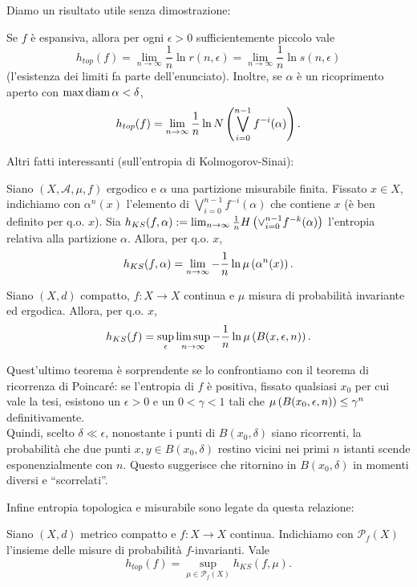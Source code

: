Diamo un risultato utile senza dimostrazione:

\begin{teo}Se $f$ è espansiva, allora per ogni $\epsilon>0$ sufficientemente piccolo vale
\[ h_{top}(f)=\lim_{n\to\infty}\frac{1}{n}\ln r(n,\epsilon)=\lim_{n\to\infty}\frac{1}{n}\ln s(n,\epsilon) \]
(l'esistenza dei limiti fa parte dell'enunciato). Inoltre, se $\alpha$ è un ricoprimento aperto con $\max\operatorname{diam} \alpha<\delta$,
\[ h_{top}(f)=\lim_{n\to\infty}\frac{1}{n}\ln N\left(\bigvee_{i=0}^{n-1}f^{-i}(\alpha)\right). \]
\end{teo}

Altri fatti interessanti (sull'entropia di Kolmogorov-Sinai):

\begin{teo}Siano $(X,\mathcal{A},\mu,f)$ ergodico e $\alpha$ una partizione misurabile finita.
Fissato $x\in X$, indichiamo con $\alpha^n(x)$ l'elemento di $\bigvee_{i=0}^{n-1}f^{-i}(\alpha)$ che contiene $x$
(è ben definito per q.o. $x$). Sia $h_{KS}(f,\alpha):=\lim_{n\to\infty}\frac{1}{n}H\left(\vee_{i=0}^{n-1}f^{-k}(\alpha)\right)$
l'entropia relativa alla partizione $\alpha$. Allora, per q.o. $x$,
\[ h_{KS}(f,\alpha)=\lim_{n\to\infty}-\frac{1}{n}\ln \mu\left(\alpha^n(x)\right). \]
\end{teo}

\begin{teo}Siano $(X,d)$ compatto, $f:X\to X$ continua e $\mu$ misura di probabilità invariante ed ergodica.
Allora, per q.o. $x$,
\[ h_{KS}(f)=\sup_\epsilon\limsup_{n\to\infty}-\frac{1}{n}\ln\mu\left(B(x,\epsilon,n)\right). \]
\end{teo}

Quest'ultimo teorema è sorprendente se lo confrontiamo con il teorema di ricorrenza di Poincaré:
se l'entropia di $f$ è positiva, fissato qualsiasi $x_0$ per cui vale la tesi, esistono un $\epsilon>0$ e un $0<\gamma<1$ tali che
$\mu\left(B(x_0,\epsilon,n)\right)\le \gamma^n$ definitivamente. \\
Quindi, scelto $\delta\ll\epsilon$, nonostante i punti di $B(x_0,\delta)$ siano ricorrenti, la probabilità che
due punti $x,y\in B(x_0,\delta)$ restino vicini nei primi $n$ istanti scende esponenzialmente con $n$.
Questo suggerisce che ritornino in $B(x_0,\delta)$ in momenti diversi e ``scorrelati''.

Infine entropia topologica e misurabile sono legate da questa relazione:
\begin{teo}Siano $(X,d)$ metrico compatto e $f:X\to X$ continua. Indichiamo con $\mathcal{P}_f(X)$ l'insieme
delle misure di probabilità $f$-invarianti. Vale
\[ h_{top}(f)=\sup_{\mu\in\mathcal{P}_f(X)}h_{KS}(f,\mu). \]
\end{teo}

